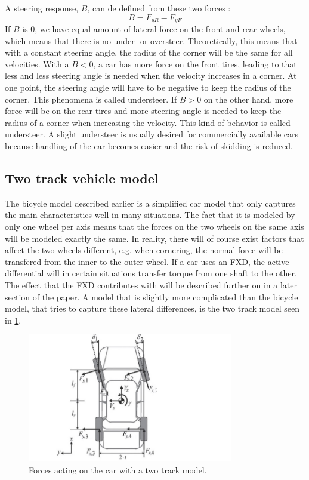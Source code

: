 A steering response, $ B $, can de defined from these two forces \cite{fordonsdynamik99}:
\begin{equation}
	B = F_{yR} - F_{yF}
\end{equation}
If $ B $ is 0, we have equal amount of lateral force on the front and rear wheels, which means that there is no under- or oversteer. Theoretically, this means that with a constant steering angle, the radius of the corner will be the same for all velocities. With a $ B < 0 $, a car has more force on the front tires, leading to that less and less steering angle is needed when the velocity increases in a corner. At one point, the steering angle will have to be negative to keep the radius of the corner. This phenomena is called understeer. If $ B > 0 $ on the other hand, more force will be on the rear tires and more steering angle is needed to keep the radius of a corner when increasing the velocity. This kind of behavior is called understeer. A slight understeer is usually desired for commercially available cars because handling of the car becomes easier and the risk of skidding is reduced.

\subsection{Two track vehicle model}

The bicycle model described earlier is a simplified car model that only captures the main characteristics well in many situations. The fact that it is modeled by only one wheel per axis means that the forces on the two wheels on the same axis will be modeled exactly the same. In reality, there will of course exist factors that affect the two wheels different, e.g. when cornering, the normal force will be transfered from the inner to the outer wheel. If a car uses an FXD, the active differential will in certain situations transfer torque from one shaft to the other. The effect that the FXD contributes with will be described further on in a later section of the paper. A model that is slightly more complicated than the bicycle model,  that tries to capture these lateral differences, is the two track model seen in \ref{two_track_model}. 

\begin{figure}[h]
	\centering
	\includegraphics[width=0.8\textwidth]{Pictures/two_track_model}
	\caption{Forces acting on the car with a two track model.}
	\label{two_track_model}
\end{figure}

